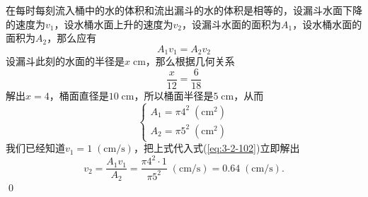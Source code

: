 \solve 在每时每刻流入桶中的水的体积和流出漏斗的水的体积是相等的，设漏斗水面下降的速度为$v_1$，设水桶水面上升的速度为$v_2$，设漏斗水面的面积为$A_1$，设水桶水面的面积为$A_2$，那么应有
\begin{equation}
    A_1 v_1 = A_2 v_2
    \label{eq:3-2-102}
\end{equation}
设漏斗此刻的水面的半径是$x \; \si{\centi\metre}$，那么根据几何关系
\begin{equation}
    \frac{x}{12} = \frac{6}{18}
\end{equation}
解出$x=4$，桶面直径是$10 \; \si{\centi\metre}$，所以桶面半径是$5 \; \si{\centi\metre}$，从而
\begin{equation}
    \begin{cases}
        A_1 = \pi 4^2 \; (\si{\centi\metre^2}) \\
        A_2 = \pi 5^2 \; (\si{\centi\metre^2})
    \end{cases}
\end{equation}
我们已经知道$v_1 = 1 \; (\si{\centi\metre/\second})$，把上式代入式(\ref{eq:3-2-102})立即解出
\begin{equation}
    v_2 = \frac{A_1 v_1}{A_2} = \frac{\pi 4^2 \cdot 1}{\pi 5^2} \; (\si{\centi\metre/\second}) = 0.64 \; (\si{\centi\metre/\second}).
\end{equation}
\qed\bigskip
